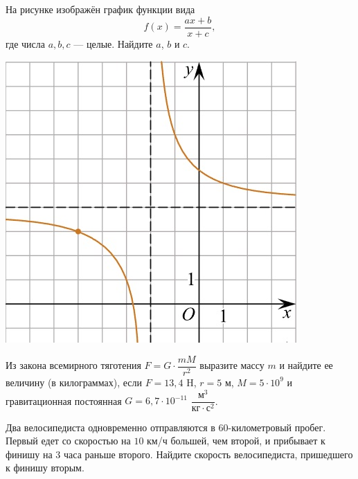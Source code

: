 \begin{class}[number=10]
\begin{listofex}
\begin{minipage}[t]{\picwidth}
		\end{minipage}
		\item
		\begin{minipage}[t]{\bodywidth}
			На рисунке изображён график функции вида \[ f(x)=\dfrac{ax+b}{x+c}, \] где числа \(a, b, c\) --- целые. Найдите \( a \), \( b \) и \( c \).
		\end{minipage}
		\hspace{0.02\linewidth}
		\begin{minipage}[t]{\picwidth}
			\includegraphics[align=t, width=\linewidth]{../../pics/G101M4C6-5}
		\end{minipage}
		\item Из закона всемирного тяготения \( F=G\cdot\dfrac{mM}{r^2} \) выразите массу \( m \) и найдите ее величину (в килограммах), если \( F=13,4 \) H, \( r=5 \) м, \( M=5\cdot10^9 \) и гравитационная постоянная \( G=6,7\cdot10^{-11} \) \( \dfrac{\text{м}^3}{\text{кг}\cdot\text{с}^2} \).
		\item Два велосипедиста одновременно отправляются в \( 60 \)-километровый пробег. Первый едет со скоростью на \( 10 \) км/ч большей, чем второй, и прибывает к финишу на \( 3 \) часа раньше второго. Найдите скорость велосипедиста, пришедшего к финишу вторым.
	\end{listofex}
\end{class}

